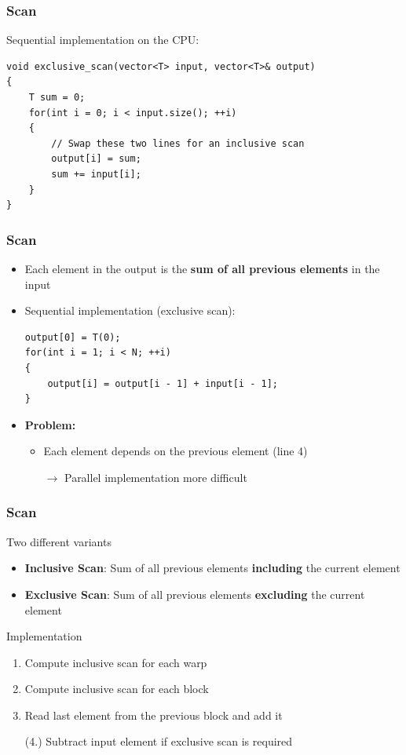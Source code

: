 \documentclass[aspectratio=169,handout]{beamer}
\begin{document}
\begin{frame}[fragile]
	\frametitle{Scan}
	Sequential implementation on the CPU:
\begin{lstlisting}
void exclusive_scan(vector<T> input, vector<T>& output)
{
	T sum = 0;
	for(int i = 0; i < input.size(); ++i)
	{
		// Swap these two lines for an inclusive scan
		output[i] = sum;
		sum += input[i];
	}
}
\end{lstlisting}
\end{frame}

\begin{frame}[fragile]
	\frametitle{Scan}
	\begin{itemize}
		\item Each element in the output is the \textbf{sum of all previous elements} in the input
		\item<2-> Sequential implementation (exclusive scan):
\begin{lstlisting}
output[0] = T(0);
for(int i = 1; i < N; ++i)
{
	output[i] = output[i - 1] + input[i - 1];
}
\end{lstlisting}
\item<3-> \textbf{Problem:}
\begin{itemize}
	\item Each element depends on the previous element (line 4)
	\item[$\rightarrow$] Parallel implementation more difficult 
\end{itemize}

\end{itemize}
\end{frame}


\begin{frame}[fragile]
\frametitle{Scan}
Two different variants
\begin{itemize}
	\item \textbf{Inclusive Scan}: Sum of all previous elements \textbf{including} the current element
	\item \textbf{Exclusive Scan}: Sum of all previous elements \textbf{excluding} the current element
\end{itemize}
Implementation
\begin{enumerate}
	\item Compute inclusive scan for each warp
	\item Compute inclusive scan for each block
	\item Read last element from the previous block and add it
	\item[(4.)] Subtract input element if exclusive scan is required
\end{enumerate}
\end{frame}
\end{document}
